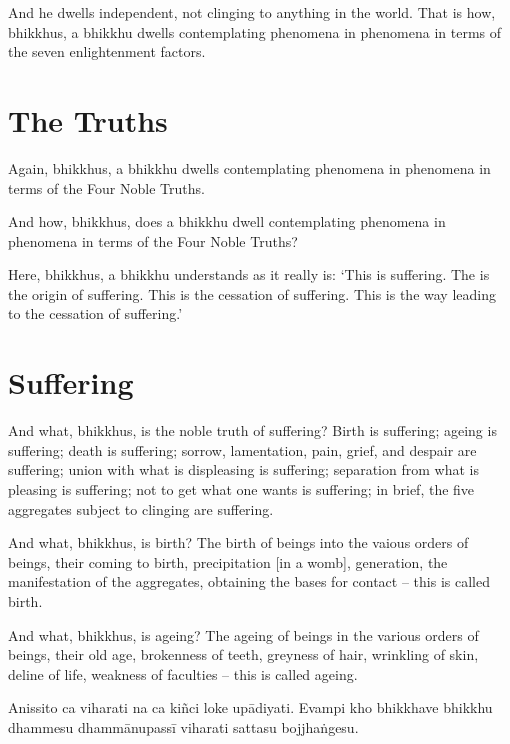 \englishPage

And he dwells independent, not clinging to anything in the world. That is how,
bhikkhus, a bhikkhu dwells contemplating phenomena in phenomena in terms of the
seven enlightenment factors.


\section{The Truths}

Again, bhikkhus, a bhikkhu dwells contemplating phenomena in phenomena in terms
of the Four Noble Truths.

And how, bhikkhus, does a bhikkhu dwell contemplating phenomena in phenomena in
terms of the Four Noble Truths?

Here, bhikkhus, a bhikkhu understands as it really is: `This is suffering. The
is the origin of suffering. This is the cessation of suffering. This is the way
leading to the cessation of suffering.'

\section{Suffering}

And what, bhikkhus, is the noble truth of suffering? Birth is suffering; ageing
is suffering; death is suffering; sorrow, lamentation, pain, grief, and despair
are suffering; union with what is displeasing is suffering; separation from what
is pleasing is suffering; not to get what one wants is suffering; in brief, the
five aggregates subject to clinging are suffering.

And what, bhikkhus, is birth? The birth of beings into the vaious orders of
beings, their coming to birth, precipitation [in a womb], generation, the
manifestation of the aggregates, obtaining the bases for contact -- this is
called birth.

And what, bhikkhus, is ageing? The ageing of beings in the various orders of
beings, their old age, brokenness of teeth, greyness of hair, wrinkling of skin,
deline of life, weakness of faculties -- this is called ageing.

\paliPage

Anissito ca viharati na ca kiñci loke upādiyati. Evampi kho bhikkhave bhikkhu
dhammesu dhammānupassī viharati sattasu bojjhaṅgesu.


